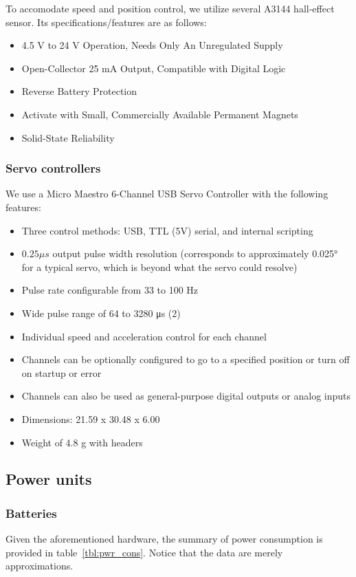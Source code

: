 \documentclass[a4paper, 10pt, twocolumn, titlepage]{article}
\begin{document}
To accomodate speed and position control, we utilize several A3144 hall-effect sensor.
Its specifications/features are as follows:
\begin{itemize}
\itemsep-1mm
  \item 4.5 V to 24 V Operation, Needs Only An Unregulated Supply
  \item Open-Collector 25 mA Output, Compatible with Digital Logic
  \item Reverse Battery Protection
  \item Activate with Small, Commercially Available Permanent Magnets
  \item Solid-State Reliability
\end{itemize}

\subsubsection{Servo controllers}
We use a Micro Maestro 6-Channel USB Servo Controller with the following features:
\begin{itemize}
\itemsep-1mm
  \item Three control methods: USB, TTL (5V) serial, and internal scripting
  \item $0.25 \mu s$ output pulse width resolution (corresponds to approximately 0.025° for a typical servo, which is beyond what the servo could resolve)
  \item Pulse rate configurable from 33 to 100 Hz
  \item Wide pulse range of 64 to 3280 μs (2)
  \item Individual speed and acceleration control for each channel
  \item Channels can be optionally configured to go to a specified position or turn off on startup or error
  \item Channels can also be used as general-purpose digital outputs or analog inputs
  \item Dimensions: 21.59 x 30.48 x 6.00
  \item Weight of 4.8 g with headers
\end{itemize}

\subsection{Power units}
\subsubsection{Batteries} \label{subsubsec:batt}
Given the aforementioned hardware, the summary of power consumption is provided in table~\ref{tbl:pwr_cons}.
Notice that the data are merely approximations.
\end{document}
